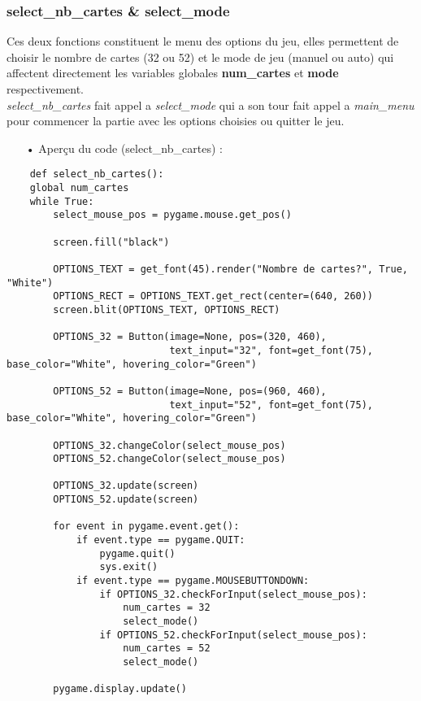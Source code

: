	\subsubsection{select\_nb\_cartes \& select\_mode}
	Ces deux fonctions constituent le menu des options du jeu, elles permettent de choisir le nombre de cartes (32 ou 52) et le mode de jeu (manuel ou auto) qui affectent directement les variables globales \textbf{num\_cartes} et \textbf{mode} respectivement.\\
	\emph{select\_nb\_cartes} fait appel a \emph{select\_mode} qui a son tour fait appel a \emph{main\_menu} pour commencer la partie avec les options choisies ou quitter le jeu.
	\\
	\begin{itemize}
	\color{blue}\item[•]Aperçu du code (select\_nb\_cartes) :
	\end{itemize}
	\begin{lstlisting}
	def select_nb_cartes():
    global num_cartes
    while True:
        select_mouse_pos = pygame.mouse.get_pos()

        screen.fill("black")

        OPTIONS_TEXT = get_font(45).render("Nombre de cartes?", True, "White")
        OPTIONS_RECT = OPTIONS_TEXT.get_rect(center=(640, 260))
        screen.blit(OPTIONS_TEXT, OPTIONS_RECT)

        OPTIONS_32 = Button(image=None, pos=(320, 460), 
                            text_input="32", font=get_font(75), base_color="White", hovering_color="Green")

        OPTIONS_52 = Button(image=None, pos=(960, 460), 
                            text_input="52", font=get_font(75), base_color="White", hovering_color="Green")

        OPTIONS_32.changeColor(select_mouse_pos)
        OPTIONS_52.changeColor(select_mouse_pos)

        OPTIONS_32.update(screen)
        OPTIONS_52.update(screen)

        for event in pygame.event.get():
            if event.type == pygame.QUIT:
                pygame.quit()
                sys.exit()
            if event.type == pygame.MOUSEBUTTONDOWN:
                if OPTIONS_32.checkForInput(select_mouse_pos):
                    num_cartes = 32
                    select_mode()
                if OPTIONS_52.checkForInput(select_mouse_pos):
                    num_cartes = 52
                    select_mode()

        pygame.display.update()
	\end{lstlisting}
	
